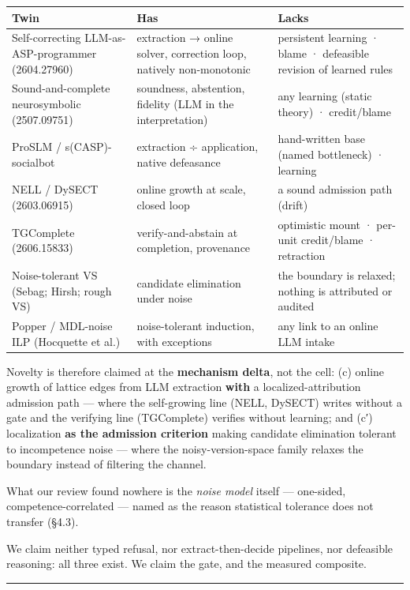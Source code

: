 \documentclass[11pt]{article}
\begin{document}
\begin{center}\small\begin{tabular}{lll}\toprule
Twin & Has & Lacks \\ \midrule
Self-correcting LLM-as-ASP-programmer (2604.27960) & extraction → online solver, correction loop, natively non-monotonic & persistent learning · blame · defeasible revision of learned rules \\
Sound-and-complete neurosymbolic (2507.09751) & soundness, abstention, fidelity (LLM in the interpretation) & any learning (static theory) · credit/blame \\
ProSLM / s(CASP)-socialbot & extraction ÷ application, native defeasance & hand-written base (named bottleneck) · learning \\
NELL / DySECT (2603.06915) & online growth at scale, closed loop & a sound admission path (drift) \\
TGComplete (2606.15833) & verify-and-abstain at completion, provenance & optimistic mount · per-unit credit/blame · retraction \\
Noise-tolerant VS (Sebag; Hirsh; rough VS) & candidate elimination under noise & the boundary is relaxed; nothing is attributed or audited \\
Popper / MDL-noise ILP (Hocquette et al.) & noise-tolerant induction, with exceptions & any link to an online LLM intake \\
\bottomrule\end{tabular}\end{center}

Novelty is therefore claimed at the \textbf{mechanism delta}, not the cell: (c) online growth of lattice edges from LLM extraction \textbf{with} a localized-attribution admission path — where the self-growing line (NELL, DySECT) writes without a gate and the verifying line (TGComplete) verifies without learning; and (c′) localization \textbf{as the admission criterion} making candidate elimination tolerant to incompetence noise — where the noisy-version-space family relaxes the boundary instead of filtering the channel.

What our review found nowhere is the \emph{noise model} itself — one-sided, competence-correlated — named as the reason statistical tolerance does not transfer (§4.3).

We claim neither typed refusal, nor extract-then-decide pipelines, nor defeasible reasoning: all three exist. We claim the gate, and the measured composite.

\medskip\hrule\medskip
\end{document}
